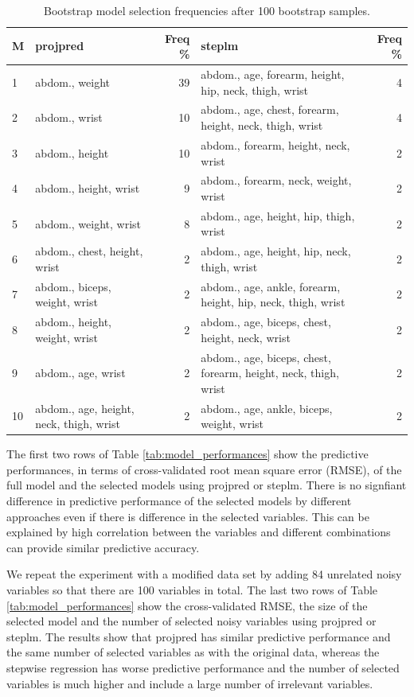 \documentclass[a4]{article}
\theoremstyle{definition}
\begin{document}
\begin{table}[tp]
\footnotesize
\centering
\begin{tabular}{l|lr|lr}
M & projpred & Freq \% & steplm & Freq \%  \\ 
  \hline
1 & abdom., weight & 39 & abdom., age, forearm, height, hip, neck, thigh, wrist & 4 \\
2 & abdom., wrist & 10 & abdom., age, chest, forearm, height, neck, thigh, wrist & 4 \\
3 & abdom., height & 10 & abdom., forearm, height, neck, wrist & 2 \\
4 & abdom., height, wrist & 9 & abdom., forearm, neck, weight, wrist & 2 \\
5 & abdom., weight, wrist & 8 & abdom., age, height, hip, thigh, wrist & 2 \\
6 & abdom., chest, height, wrist & 2 & abdom., age, height, hip, neck, thigh, wrist & 2 \\
7 & abdom., biceps, weight, wrist & 2 & abdom., age, ankle, forearm, height, hip, neck, thigh, wrist & 2 \\
8 & abdom., height, weight, wrist & 2 & abdom., age, biceps, chest, height, neck, wrist & 2 \\
9 & abdom., age, wrist & 2 & abdom., age, biceps, chest, forearm, height, neck, thigh, wrist & 2 \\
10 & abdom., age, height, neck, thigh, wrist & 2 & abdom., age, ankle, biceps, weight, wrist & 2 \\
\end{tabular}
\caption{Bootstrap model selection frequencies after 100 bootstrap samples.}
\label{tab:model_frequencies}
\end{table}


The first two rows of Table \ref{tab:model_performances} show the
predictive performances, in terms of cross-validated root mean square
error (RMSE), of the full model and the selected models using projpred
or steplm.  There is no signfiant difference in predictive performance
of the selected models by different approaches even if there is
difference in the selected variables. This can be explained by high
correlation between the variables and different combinations can
provide similar predictive accuracy.

We repeat the experiment with a modified data set by adding 84
unrelated noisy variables so that there are 100 variables in total. 
The last two rows of Table
\ref{tab:model_performances} show the cross-validated RMSE, the size
of the selected model and the number of selected noisy variables using
projpred or steplm. The results show that projpred has similar
predictive performance and the same number of selected variables as
with the original data, whereas the stepwise regression has worse
predictive performance and the number of selected variables is much
higher and include a large number of irrelevant variables.
\end{document}
